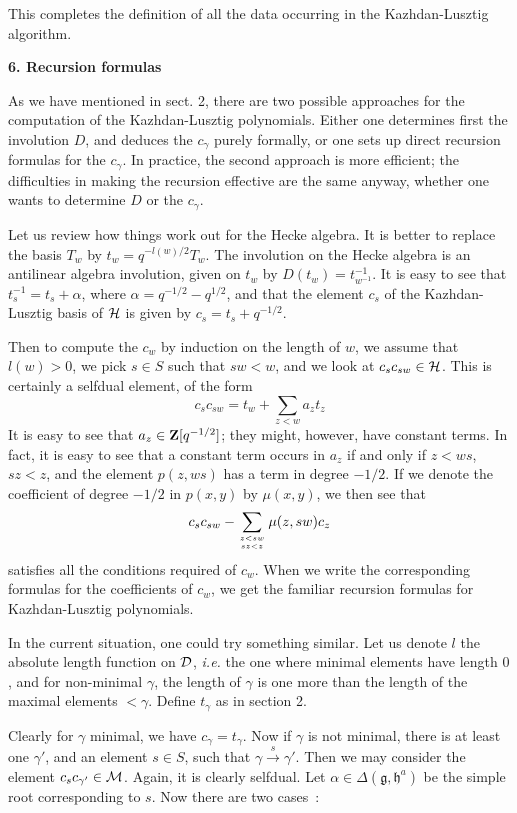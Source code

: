 \documentclass[11 pt]{article}
\def\ra{\rightarrow}
\def\rao#1{\overset{#1}\ra}
\def\1{^{-1}}
\def\a{\alpha}
\def\D{{\cal D}}
\def\g{\gamma}
\def\gf{{\mathfrak g}}
\def\Hc{{\cal H}}
\def\hf{{\mathfrak h}}
\def\M{{\cal M}}
\def\qmh{q^{-1/2}}
\def\Z{{\bf Z}}
\begin{document}
\medskip

This completes the definition of all the data occurring in the Kazhdan-Lusztig
algorithm.

\bigskip

\noindent\textbf{6. Recursion formulas}

\medskip

As we have mentioned in sect. 2, there are two possible approaches for the
computation of the Kazhdan-Lusztig polynomials. Either one determines first
the involution $D$, and deduces the $c_\g$ purely formally, or one sets up
direct recursion formulas for the $c_\g$. In practice, the second approach
is more efficient; the difficulties in making the recursion effective are the 
same anyway, whether one wants to determine $D$ or the $c_\g$.

\medskip

Let us review how things work out for the Hecke algebra. It is better to
replace the basis $T_w$ by $t_w=q^{-l(w)/2}T_w$. The involution on the
Hecke algebra is an antilinear algebra involution, given on $t_w$ by
$D(t_w)=t_{w\1}\1$. It is easy to see that $t_s\1=t_s+\a$, where
$\a=q^{-1/2}-q^{1/2}$, and that the element $c_s$ of the Kazhdan-Lusztig
basis of $\Hc$ is given by $c_s=t_s+\qmh$.

Then to compute the $c_w$ by induction on the length of $w$, we assume
that $l(w)>0$, we pick $s\in S$ such that $sw<w$, and we look at 
$c_sc_{sw}\in\Hc$. This is certainly a selfdual element, of the form
$$
c_sc_{sw}=t_w+\sum_{z<w}a_zt_z
$$
It is easy to see that $a_z\in\Z[\qmh]$; they might, however, have constant
terms. In fact, it is easy to see that a constant term occurs in $a_z$ if
and only if $z<ws$, $sz<z$, and the element $p(z,ws)$ has a term in degree
$-1/2$. If we denote the coefficient of degree $-1/2$ in $p(x,y)$ by 
$\mu(x,y)$, we then see that
$$
c_sc_{sw}-\sum_{z<sw\atop sz<z}\mu(z,sw)c_z
$$
satisfies all the conditions required of $c_w$. When we write the corresponding
formulas for the coefficients of $c_w$, we get the familiar recursion formulas
for Kazhdan-Lusztig polynomials.

\medskip

In the current situation, one could try something similar. Let us denote $l$
the absolute length function on $\D$, {\em i.e.} the one where minimal elements
have length $0$, and for non-minimal $\g$, the length of $\g$ is one more than
the length of the maximal elements $<\g$. Define $t_\g$ as in section 2.

Clearly for $\g$ minimal, we have $c_\g=t_\g$. Now if $\g$ is not minimal,
there is at least one $\g'$, and an element $s\in S$, such that $\g\rao s\g'$.
Then we may consider the element $c_sc_{\g'}\in \M$. Again, it is clearly 
selfdual. Let $\a\in\Delta(\gf,\hf^a)$ be the simple root corresponding to
$s$. Now there are two cases~:
\end{document}
